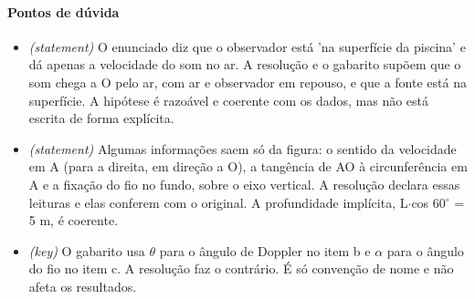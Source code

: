 \documentclass{article}%
\begin{document}
\paragraph{Pontos de dúvida}%
\begin{itemize}%
\item%
\textit{(statement)} O enunciado diz que o observador está 'na superfície da piscina' e dá apenas a velocidade do som no ar. A resolução e o gabarito supõem que o som chega a O pelo ar, com ar e observador em repouso, e que a fonte está na superfície. A hipótese é razoável e coerente com os dados, mas não está escrita de forma explícita.%
\item%
\textit{(statement)} Algumas informações saem só da figura: o sentido da velocidade em A (para a direita, em direção a O), a tangência de AO à circunferência em A e a fixação do fio no fundo, sobre o eixo vertical. A resolução declara essas leituras e elas conferem com o original. A profundidade implícita, L$\cdot$cos 60$^\circ$ = 5 m, é coerente.%
\item%
\textit{(key)} O gabarito usa $\theta$ para o ângulo de Doppler no item b e $\alpha$ para o ângulo do fio no item c. A resolução faz o contrário. É só convenção de nome e não afeta os resultados.%
\end{itemize}%
\end{document}
